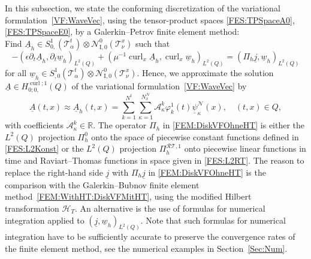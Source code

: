 \documentclass[a4paper,11pt]{article}
\newcommand{\R}{\mathbb R}
\newcommand{\cu}{\operatorname{curl}}
\renewcommand{\vec}[1]{\underline{#1}}
\begin{document}
In this subsection, we state the conforming discretization of the variational formulation~\eqref{VF:WaveVec}, using the tensor-product spaces \eqref{FES:TPSpaceA0}, \eqref{FES:TPSpaceE0}, 
by a Galerkin--Petrov finite element method:\\
Find $\vec A_h \in S_{0,}^1(\mathcal T^t_\alpha) \otimes \mathcal N_\mathrm{I,0}^0(\mathcal T^x_\nu)$ such that
\begin{equation}  \label{FEM:DiskVFOhneHT}
	-(\epsilon \partial_t \vec A_h, \partial_t \vec w_h )_{L^2(Q)} + (\mu^{-1} \cu_x \vec A_h, \cu_x \vec w_h )_{L^2(Q)}  = (\Pi_h \vec j, \vec w_h)_{L^2(Q)}
\end{equation}
for all $\vec w_h \in S_{,0}^1(\mathcal T^t_\alpha) \otimes \mathcal N_\mathrm{I,0}^0(\mathcal T^x_\nu)$. Hence, we approximate the solution $\vec A \in H^{\cu;1}_{0;0,} (Q)$ of the variational formulation~\eqref{VF:WaveVec} by
\begin{equation} \label{FEM:DarstellungAh}
	\vec A(t,x) \approx \vec A_h(t,x) = \sum_{k=1}^{N^t} \sum_{\kappa=1}^{N_x^{\mathcal{N}}} \mathcal A_\kappa^k \varphi^1_k(t) \vec \psi^\mathcal{N}_\kappa(x), \quad (t,x) \in Q,
\end{equation}
with coefficients $\mathcal A_\kappa^k \in \R$. The operator $\Pi_h$ in \eqref{FEM:DiskVFOhneHT} is either the $L^2(Q)$ projection $\Pi_h^0$ onto the space of piecewise constant functions defined in \eqref{FES:L2Konst} or the $L^2(Q)$ projection $\Pi_h^{\mathcal{RT},1}$ onto piecewise linear functions in time and Raviart--Thomas functions in space given in \eqref{FES:L2RT}. The reason to replace the right-hand side $\vec j$ with $\Pi_h \vec j$ in \eqref{FEM:DiskVFOhneHT} is the comparison with the Galerkin--Bubnov finite element method~\eqref{FEM:WithHT:DiskVFMitHT}, using the modified Hilbert transformation $\mathcal H_T$. An alternative is the use of formulas for numerical integration applied to $(\vec j, \vec w_h)_{L^2(Q)}$. Note that such formulas for numerical integration have to be sufficiently accurate to preserve the convergence rates of the finite element method, see the numerical examples in Section~\ref{Sec:Num}.
\end{document}

